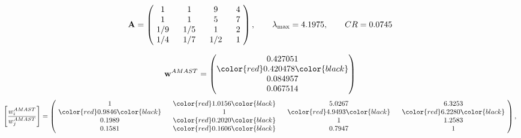\begin{example}
\begin{equation*}
\mathbf{A} =
\begin{pmatrix}
$\,\,$ 1 $\,\,$ & $\,\,$1$\,\,$ & $\,\,$9$\,\,$ & $\,\,$4 $\,\,$ \\
$\,\,$ 1 $\,\,$ & $\,\,$ 1 $\,\,$ & $\,\,$5$\,\,$ & $\,\,$7 $\,\,$ \\
$\,\,$ 1/9$\,\,$ & $\,\,$ 1/5$\,\,$ & $\,\,$ 1 $\,\,$ & $\,\,$2 $\,\,$ \\
$\,\,$ 1/4$\,\,$ & $\,\,$ 1/7$\,\,$ & $\,\,$ 1/2$\,\,$ & $\,\,$ 1  $\,\,$ \\
\end{pmatrix},
\qquad
\lambda_{\max} =
4.1975,
\qquad
CR = 0.0745
\end{equation*}

\begin{equation*}
\mathbf{w}^{AMAST} =
\begin{pmatrix}
0.427051\\
\color{red} 0.420478\color{black} \\
0.084957\\
0.067514
\end{pmatrix}\end{equation*}
\begin{equation*}
\left[ \frac{{w}^{AMAST}_i}{{w}^{AMAST}_j} \right] =
\begin{pmatrix}
$\,\,$ 1 $\,\,$ & $\,\,$\color{red} 1.0156\color{black} $\,\,$ & $\,\,$5.0267$\,\,$ & $\,\,$6.3253$\,\,$ \\
$\,\,$\color{red} 0.9846\color{black} $\,\,$ & $\,\,$ 1 $\,\,$ & $\,\,$\color{red} 4.9493\color{black} $\,\,$ & $\,\,$\color{red} 6.2280\color{black}   $\,\,$ \\
$\,\,$0.1989$\,\,$ & $\,\,$\color{red} 0.2020\color{black} $\,\,$ & $\,\,$ 1 $\,\,$ & $\,\,$1.2583 $\,\,$ \\
$\,\,$0.1581$\,\,$ & $\,\,$\color{red} 0.1606\color{black} $\,\,$ & $\,\,$0.7947$\,\,$ & $\,\,$ 1  $\,\,$ \\
\end{pmatrix},
\end{equation*}


\end{example}
